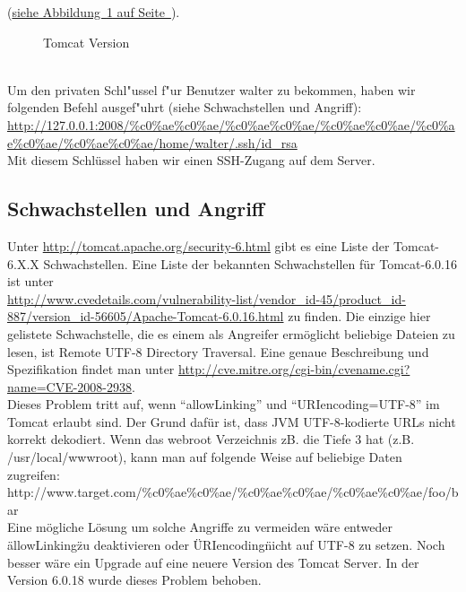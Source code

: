 \documentclass[12pt,a4paper,titlepage,oneside]{scrartcl}
\begin{document}
(\hyperref[fig:image2]{siehe Abbildung~\ref*{fig:image2} auf Seite~\pageref*{fig:image2}}).
\begin{figure}[h!]
  \centering
  \caption{Tomcat Version}
  \label{fig:image2}
\end{figure}
\\
Um den privaten Schl"ussel f"ur Benutzer walter zu bekommen, haben wir folgenden Befehl ausgef"uhrt (siehe Schwachstellen und Angriff): \\\url{http://127.0.0.1:2008/\%c0\%ae\%c0\%ae/\%c0\%ae\%c0\%ae/\%c0\%ae\%c0\%ae/\%c0\%ae\%c0\%ae/\%c0\%ae\%c0\%ae/home/walter/.ssh/id_rsa}
\\Mit diesem Schlüssel haben wir einen SSH-Zugang auf dem Server.

\subsection{Schwachstellen und Angriff}
Unter \url{http://tomcat.apache.org/security-6.html} gibt es eine Liste der Tomcat-6.X.X Schwachstellen. Eine Liste der bekannten Schwachstellen für Tomcat-6.0.16 ist unter \\ \url{http://www.cvedetails.com/vulnerability-list/vendor_id-45/product_id-887/version_id-56605/Apache-Tomcat-6.0.16.html} zu finden. Die einzige hier gelistete Schwachstelle, die es einem als Angreifer ermöglicht beliebige Dateien zu lesen, ist Remote UTF-8 Directory Traversal. Eine genaue Beschreibung und Spezifikation findet man unter \url{http://cve.mitre.org/cgi-bin/cvename.cgi?name=CVE-2008-2938}. \\ 
Dieses Problem tritt auf, wenn ``allowLinking'' und ``URIencoding=UTF-8'' im Tomcat erlaubt sind. Der Grund dafür ist, dass JVM UTF-8-kodierte URLs nicht korrekt dekodiert. Wenn das webroot Verzeichnis zB. die Tiefe 3 hat (z.B. /usr/local/wwwroot), kann man auf folgende Weise auf beliebige Daten zugreifen: \\ http://www.target.com/\%c0\%ae\%c0\%ae/\%c0\%ae\%c0\%ae/\%c0\%ae\%c0\%ae/foo/bar   \\Eine mögliche Lösung um solche Angriffe zu vermeiden wäre entweder \"allowLinking\" zu deaktivieren oder \"URIencoding\" nicht auf UTF-8 zu setzen. Noch besser wäre ein Upgrade auf eine neuere Version des Tomcat Server. In der Version 6.0.18 wurde dieses Problem behoben. 
\end{document}
